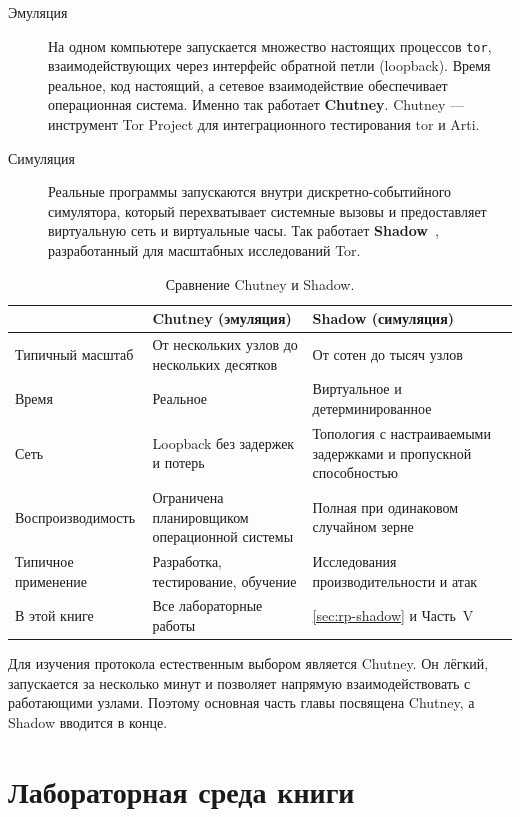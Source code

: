 \begin{description}
  \item[Эмуляция] На одном компьютере запускается множество настоящих процессов \texttt{tor}, взаимодействующих через интерфейс обратной петли (loopback). Время реальное, код настоящий, а сетевое взаимодействие обеспечивает операционная система. Именно так работает \textbf{Chutney}. Chutney — инструмент Tor Project для интеграционного тестирования tor и Arti.
  \item[Симуляция] Реальные программы запускаются внутри дискретно-событийного симулятора, который перехватывает системные вызовы и предоставляет виртуальную сеть и виртуальные часы. Так работает \textbf{Shadow}~\cite{jansen2012shadow}, разработанный для масштабных исследований Tor.
\end{description}

\begin{table}[htbp]
\centering\small
\begin{tabularx}{\textwidth}{@{}l>{\raggedright\arraybackslash}X>{\raggedright\arraybackslash}X@{}}
\toprule
 & Chutney (эмуляция) & Shadow (симуляция) \\
\midrule
Типичный масштаб & От нескольких узлов до нескольких десятков & От сотен до тысяч узлов \\
Время & Реальное & Виртуальное и детерминированное \\
Сеть & Loopback без задержек и потерь & Топология с настраиваемыми задержками и пропускной способностью \\
Воспроизводимость & Ограничена планировщиком операционной системы & Полная при одинаковом случайном зерне \\
Типичное применение & Разработка, тестирование, обучение & Исследования производительности и атак \\
В этой книге & Все лабораторные работы & \cref{sec:rp-shadow} и Часть~V \\
\bottomrule
\end{tabularx}
\caption{Сравнение Chutney и Shadow.}
\label{tab:chutney-shadow}
\end{table}

Для изучения протокола естественным выбором является Chutney. Он лёгкий, запускается за несколько минут и позволяет напрямую взаимодействовать с работающими узлами. Поэтому основная часть главы посвящена Chutney, а Shadow вводится в конце.

\section{Лабораторная среда книги}\label{sec:rp-avvio}

